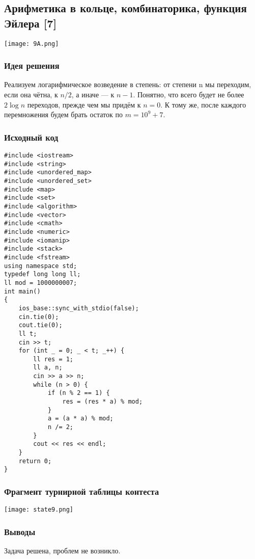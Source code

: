 \subsection*{Арифметика в кольце, комбинаторика, функция Эйлера [7] }
\begin{center}
\texttt{[image: 9A.png]}
\end{center}
\subsubsection*{Идея решения}
Реализуем логарифмическое возведение в степень: от степени n мы переходим, если она чётна, к $n / 2$, а иначе — к $n-1$. Понятно, что всего будет не более $2 \log n$ переходов, прежде чем мы придём к $n = 0$. К тому же, после каждого перемножения будем брать остаток по $m=10^9+7$.
\subsubsection*{Исходный код}
\begin{lstlisting}
#include <iostream>
#include <string>
#include <unordered_map>
#include <unordered_set>
#include <map>
#include <set>
#include <algorithm>
#include <vector>
#include <cmath>
#include <numeric>
#include <iomanip>
#include <stack>
#include <fstream>
using namespace std;
typedef long long ll;
ll mod = 1000000007;
int main()
{
    ios_base::sync_with_stdio(false);
    cin.tie(0);
    cout.tie(0);
    ll t;
    cin >> t;
    for (int _ = 0; _ < t; _++) {
        ll res = 1;
        ll a, n;
        cin >> a >> n;
        while (n > 0) {
            if (n % 2 == 1) {
                res = (res * a) % mod;
            }
            a = (a * a) % mod;
            n /= 2;
        }
        cout << res << endl;
    }
    return 0;
}
\end{lstlisting}
\subsubsection*{Фрагмент турнирной таблицы контеста}
\begin{center}
\texttt{[image: state9.png]}\newline\noindent
\end{center}

\subsubsection*{Выводы}
Задача решена, проблем не возникло.

